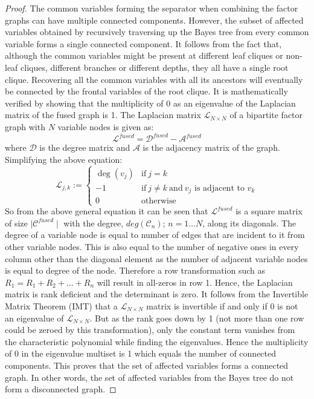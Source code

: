 \begin{proof}
The common variables forming the separator when combining the factor graphs can have multiple connected components. However, the  subset of affected variables obtained by recursively traversing up the Bayes tree from every common variable forms a single connected component. It follows from the fact that, although the common variables might be present at different leaf cliques or non-leaf cliques, different branches or different depths, they all have a single root clique. Recovering all the common variables with all its ancestors will eventually be connected by the frontal variables of the root clique. It is mathematically verified by showing that the multiplicity of 0 as an eigenvalue of the Laplacian matrix of the fused graph is 1. The Laplacian matrix $\mathcal{L}_{{N\times N}}$ of a bipartite factor graph with $N$ variable nodes is given as:
\begin{equation}
\mathcal{L}^{fused} = \mathcal{D}^{fused} - \mathcal{A}^{fused}
\end{equation}
where $\mathcal{D}$ is the degree matrix and $\mathcal{A}$ is the adjacency matrix of the graph. Simplifying the above equation:
\begin{equation}
{\displaystyle \mathcal{L}_{j,k}:={\begin{cases}\deg(v_{j})&{\mbox{if}}\ j=k\\-1&{\mbox{if}}\ j\neq k\ {\mbox{and}}\ v_{j}{\mbox{ is adjacent to }}v_{k}\\0&{\mbox{otherwise}}\end{cases}}} 
\end{equation} 
So from the above general equation it can be seen that $\mathcal{L}^{fused}$ is a square matrix of size $\mid \mathcal{C}^{fused} \mid$ with the degree, $deg(\mathcal{C}_n)$; $n = 1 \ldots N$, along its diagonals. The degree of a variable node is equal to number of edges that are incident to it from other variable nodes. This is also equal to the number of negative ones in every column other than the diagonal element as the number of adjacent variable nodes is equal to degree of the node. Therefore a row transformation such as $R_1 = R_1 + R_2 + \ldots + R_n$ will result in all-zeros in row 1. Hence, the Laplacian matrix is rank deficient and the determinant is zero. It follows from the Invertible Matrix Theorem (IMT) \cite{imt} that a $\mathcal{L}_{{N\times N}}$ matrix is invertible if and only if 0 is not an eigenvalue of $\mathcal{L}_{{N\times N}}$. But as the rank goes down by 1 (not more than one row could be zeroed by this transformation), only the constant term vanishes from the characteristic polynomial while finding the eigenvalues. Hence the multiplicity of 0 in the eigenvalue multiset is 1 which equals the number of connected components. This proves that the set of affected variables forms a connected graph. In other words, the set of affected variables from the Bayes tree do not form a disconnected graph.
\end{proof}

